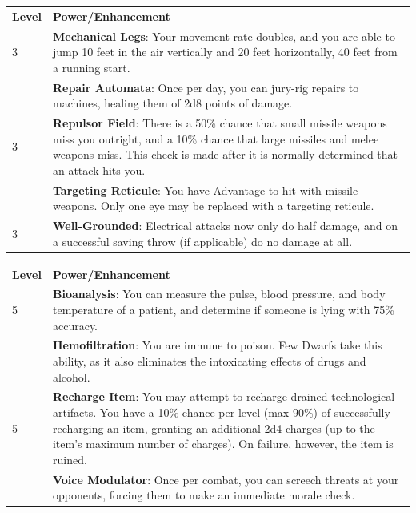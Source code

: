 \documentclass[twoside]{article}
\begin{document}
\begin{center}
\noindent\begin{tabular}{>{\centering\arraybackslash}p{}p{}}
\textbf{Level}&\textbf{Power/Enhancement}\\
\rowcolor[gray]{0.75}3&\textbf{Mechanical Legs}: Your movement rate doubles, and you are able to jump 10 feet in the air vertically and 20 feet horizontally, 40 feet from a running start.\\
3&\textbf{Repair Automata}: Once per day, you can jury-rig repairs to machines, healing them of 2d8 points of damage.\\
\rowcolor[gray]{0.75}3&\textbf{Repulsor Field}: There is a 50\% chance that small missile weapons miss you outright, and a 10\% chance that  large missiles and melee weapons miss. This check is made after it is normally determined that an attack hits you.\\
3&\textbf{Targeting Reticule}: You have Advantage to hit with missile weapons. Only one eye may be replaced with a targeting reticule.\\
\rowcolor[gray]{0.75}3&\textbf{Well-Grounded}: Electrical attacks now only do half damage, and on a successful saving throw (if applicable) do no damage at all.\\
\end{tabular}
\end{center}

\begin{center}
\noindent\begin{tabular}{>{\centering\arraybackslash}p{}p{}}
\textbf{Level}&\textbf{Power/Enhancement}\\
\rowcolor[gray]{0.75}5&\textbf{Bioanalysis}: You can measure the pulse, blood pressure, and body temperature of a patient, and determine if someone is lying with 75\% accuracy.\\
5&\textbf{Hemofiltration}: You are immune to poison. Few Dwarfs take this ability, as it also eliminates the intoxicating effects of drugs and alcohol.\\
\rowcolor[gray]{0.75}5&\textbf{Recharge Item}: You may attempt to recharge drained technological artifacts. You have a 10\% chance per level (max 90\%) of successfully recharging an item, granting an additional 2d4 charges (up to the item’s maximum number of charges). On failure, however, the item is ruined.\\
5&\textbf{Voice Modulator}: Once per combat, you can screech threats at your opponents, forcing them to make an immediate morale check.\\
\end{tabular}
\end{center}
\end{document}
